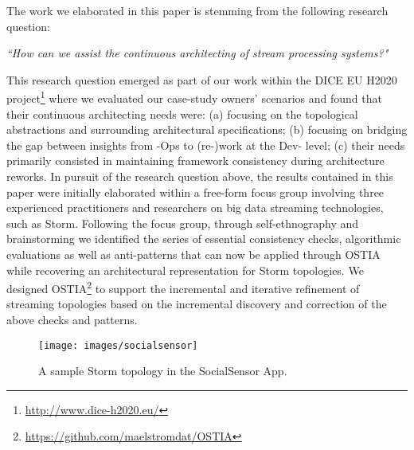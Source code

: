 
The work we elaborated in this paper is stemming from the following research question:

\begin{center}
\emph{``How can we assist the continuous architecting of stream processing systems?"}
\end{center}

This research question emerged as part of our work within the DICE EU H2020 project\footnote{\url{http://www.dice-h2020.eu/}} where we evaluated our case-study owners' scenarios and found that their continuous architecting needs were: (a) focusing on the topological abstractions and surrounding architectural specifications; (b) focusing on bridging the gap between insights from -Ops to (re-)work at the Dev- level; (c) their needs primarily consisted in maintaining framework consistency during architecture reworks.
In pursuit of the research question above, the results contained in this paper were initially elaborated within a free-form focus group \cite{focusgroup} involving three experienced practitioners and researchers on big data streaming technologies, such as Storm. Following the focus group, through self-ethnography \cite{selfeth} and brainstorming we identified the series of essential consistency checks, algorithmic evaluations as well as anti-patterns that can now be applied through OSTIA while recovering an architectural representation for Storm topologies. We designed OSTIA\footnote{\url{https://github.com/maelstromdat/OSTIA}} to support the incremental and iterative refinement of streaming topologies based on the incremental discovery and correction of the above checks and patterns.

\begin{figure*}
  \centering
  \texttt{[image: images/socialsensor]}
  \caption{A sample Storm topology in the SocialSensor App.}
  \label{socialsensor-topology}
\end{figure*}

